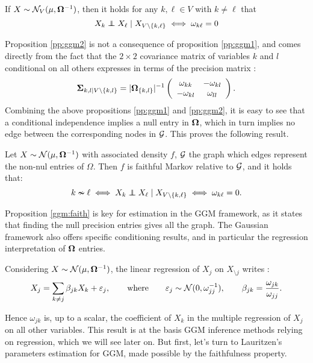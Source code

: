  \begin{prop}\label{pp:ggm2}If  $X\sim \mathcal{N}_V(\mu, {\boldsymbol{\Omega}}^{-1})$, then it holds for any $k,\ell\in V$ with $k\neq \ell$ that
$$X_k \independent X_\ell \mid X_{V\setminus\{k,\ell\}} \iff \omega_{k\ell}=0 $$
 \end{prop}
  Proposition \ref{pp:ggm2} is not a consequence of proposition \ref{pp:ggm1}, and comes directly from the fact that the $2\times 2$  covariance matrix of variables $k$ and $l$ conditional on all others expresses in terms of the precision matrix : $${\boldsymbol{\Sigma}}_{k,l\mid V\setminus\{k,l\}} = |{\boldsymbol{\Omega}}_{\{k,l\}}|^{-1} \left(\begin{array}{cc}
\omega_{kk} & -\omega_{kl}\\
-\omega_{kl} & \omega_{ll}  
  \end{array}\right).$$
Combining the above propositions \ref{pp:ggm1} and \ref{pp:ggm2}, it is easy to see that a conditional independence implies a null entry in ${\boldsymbol{\Omega}}$, which in turn implies no edge between the corresponding nodes in $\mathcal{G}$. This proves the following result.

\begin{prop}\label{ggm:faith}
 Let $X\sim \mathcal{N}(\mu, {\boldsymbol{\Omega}}^{-1})$ with associated density $f$, $\mathcal{G}$ the graph which edges represent the non-nul entries of $\Omega$. Then $f$ is faithful Markov relative to $\mathcal{G}$,  and it holds that:
 $$k\nsim \ell \iff  X_k \independent X_\ell \mid X_{V\setminus\{k,\ell\}} \iff \omega_{k\ell}=0.$$
\end{prop} 

Proposition \ref{ggm:faith} is key for estimation in the GGM framework, as it states that finding the null precision entries gives all the graph. The Gaussian framework also offers specific conditioning results, and in particular the regression interpretation of ${\boldsymbol{\Omega}}$ entries.

\begin{prop}\label{ggm:reg}
 Considering $X\sim \mathcal{N}(\mu, {\boldsymbol{\Omega}}^{-1})$, the linear regression of  $X_j$ on $X_{\setminus j}$ writes :
$$X_j = \sum_{k\neq j} \beta_{jk} X_k + \varepsilon_j,\qquad \text{where}\qquad\varepsilon_j \sim \mathcal{N} (0, \omega_{jj}^{-1}), \qquad \beta_{jk} = \frac{\omega_{jk}}{\omega_{jj}}.$$

\end{prop}
Hence $\omega_{jk}$ is, up to a scalar, the coefficient of $X_k$ in the multiple regression of $X_j$ on all other variables. This result is at the basis GGM inference methods relying on regression, which we will see later on. But first, let's turn to Lauritzen's  parameters estimation for GGM, made possible by the faithfulness property.


